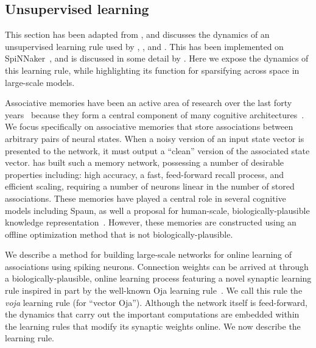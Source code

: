\subsection{Unsupervised learning}

This section has been adapted from \citet{voelker2014a}, and discusses the dynamics of an unsupervised learning rule used by \citet{voelker2014controlling}, \citet{trujillo2014a}, and \citet{aubin2016a}.
This has been implemented on SpiNNaker~\citep{knight2016}, and is discussed in some detail by \citet{aubin2018}.
Here we expose the dynamics of this learning rule, while highlighting its function for sparsifying across space in large-scale models.

Associative memories have been an active area of research over the last forty years~\citep{willshaw1969nonholographic, kohonen1972, hopfield1982} because they form a central component of many cognitive architectures~\citep{Pollack1988, Anderson1998}.
We focus specifically on associative memories that store associations between arbitrary pairs of neural states.
When a noisy version of an input state vector is presented to the network, it must output a ``clean'' version of the associated state vector.
\citet{stewart2011biologically} has built such a memory network, possessing a number of desirable properties including: high accuracy, a fast, feed-forward recall process, and efficient scaling, requiring a number of neurons linear in the number of stored associations.
 These memories have played a central role in several cognitive models including Spaun, as well a proposal for human-scale, biologically-plausible knowledge representation~\citep{crawford2015}.
However, these memories are constructed using an offline optimization method that is not biologically-plausible.

We describe a method for building large-scale networks for online learning of associations using spiking neurons.
Connection weights can be arrived at through a biologically-plausible, online learning process featuring a novel synaptic learning rule inspired in part by the well-known Oja learning rule~\citep{oja1989neural}.
We call this rule the \emph{voja} learning rule (for ``vector Oja'').
Although the network itself is feed-forward, the dynamics that carry out the important computations are embedded within the learning rules that modify its synaptic weights online.
We now describe the learning rule.

